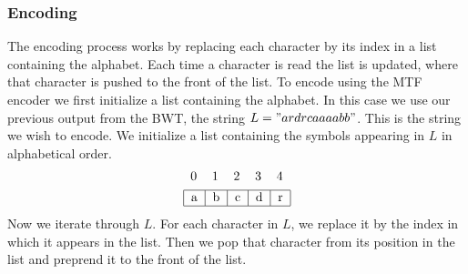 \documentclass{article}
\begin{document}
\subsubsection{Encoding}
The encoding process works by replacing each character by its index in a list containing the alphabet. Each time a character is read the list is updated, where that character is pushed to the front of the list.
To encode using the MTF encoder we first initialize a list containing the alphabet. In this case we use our previous output from the BWT, the string \(L = "ardrcaaaabb"\). This is the string we wish to encode. We initialize a list containing the symbols appearing in \(L\) in alphabetical order.
\begin{align*}
    \begin{tabular}{ccccc}
        0 & 1 & 2 & 3 & 4
    \end{tabular}
    \\
    \begin{tabular}{|c|c|c|c|c|}
        \hline
        a & b & c & d & r \\
        \hline
    \end{tabular}
\end{align*}
Now we iterate through \(L\). For each character in \(L\), we replace it by the index in which it appears in the list. Then we pop that character from its position in the list and preprend it to the front of the list.
\end{document}
